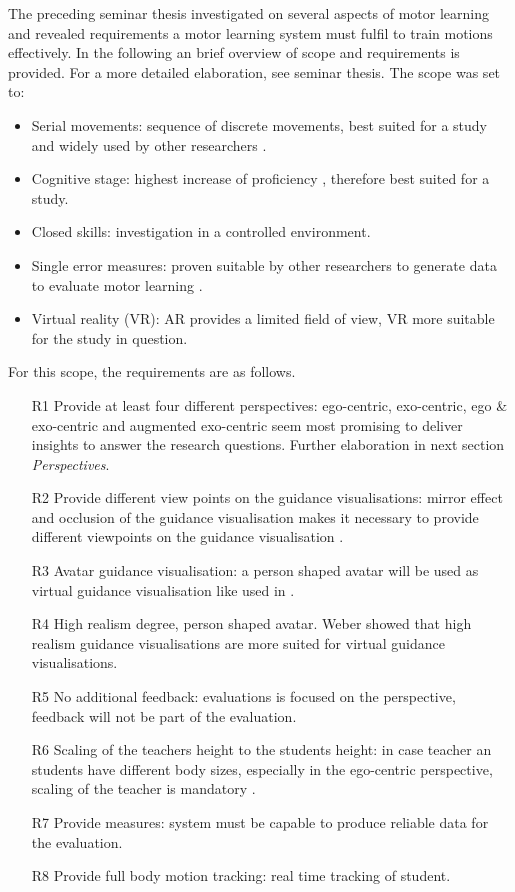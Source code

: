 The preceding seminar thesis investigated on several aspects of motor learning and revealed requirements a motor learning system must fulfil to train motions effectively. In the following an brief overview of scope and requirements is provided. For a more detailed elaboration, see seminar thesis. The scope was set to:
\begin{itemize}
	\item Serial movements: sequence of discrete movements, best suited for a study and widely used by other researchers \cite{Anderson2013, Chan2010, Hoang2016}.
	\item Cognitive stage: highest increase of proficiency , therefore best suited for a study.
	\item Closed skills: investigation in a controlled environment.
	\item Single error measures: proven suitable by other researchers to generate data to evaluate motor learning \cite{Sodhi2012, Tang2015, Komura2006}.
	\item Virtual reality (VR): AR provides a limited field of view, VR more suitable for the study in question.
\end{itemize}
For this scope, the requirements are as follows.
\begin{itemize}
	\item[R1] Provide at least four different perspectives: ego-centric, exo-centric, ego \& exo-centric and augmented exo-centric seem most promising to deliver insights to answer the research questions. Further elaboration in next section \textit{Perspectives}.
	\item[R2] Provide different view points on the guidance visualisations: mirror effect and occlusion of the guidance visualisation makes it necessary to provide different viewpoints on the guidance visualisation \cite{Chua}.
	\item[R3] Avatar guidance visualisation: a person shaped avatar will be used as virtual guidance visualisation like used in \cite{Chua, Komura2006, Han2017}.
	\item[R4] High realism degree, person shaped avatar. Weber \cite{Weber2018} showed that high realism guidance visualisations are more suited for virtual guidance visualisations.
	\item[R5] No additional feedback: evaluations is focused on the perspective, feedback will not be part of the evaluation.
	\item[R6] Scaling of the teachers height to the students height: in case teacher an students have different body sizes, especially in the ego-centric perspective, scaling of the teacher is mandatory \cite{Hoang2016}.
	\item[R7] Provide measures: system must be capable to produce reliable data for the evaluation.
	\item[R8] Provide full body motion tracking: real time tracking of student.
\end{itemize}

